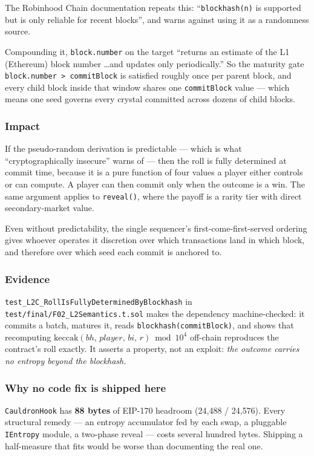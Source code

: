 \documentclass[11pt,a4paper]{article}
\newcommand{\code}[1]{\texttt{\small #1}}
\newcommand{\fileref}[1]{\texttt{\scriptsize #1}}
\begin{document}
\noindent The Robinhood Chain documentation repeats this: ``\code{blockhash(n)} is
supported but is only reliable for recent blocks'', and warns against using it as
a randomness source.

Compounding it, \code{block.number} on the target ``returns an estimate of the L1
(Ethereum) block number \dots and updates only periodically.'' So the maturity
gate \code{block.number > commitBlock} is satisfied roughly once per parent block,
and every child block inside that window shares one \code{commitBlock} value ---
which means one seed governs every crystal committed across dozens of child
blocks.

\subsubsection*{Impact}

If the pseudo-random derivation is predictable --- which is what
``cryptographically insecure'' warns of --- then the roll is fully determined at
commit time, because it is a pure function of four values a player either
controls or can compute. A player can then commit only when the outcome is a win.
The same argument applies to \code{reveal()}, where the payoff is a rarity tier
with direct secondary-market value.

Even without predictability, the single sequencer's first-come-first-served
ordering gives whoever operates it discretion over which transactions land in
which block, and therefore over which seed each commit is anchored to.

\subsubsection*{Evidence}

\code{test\_L2C\_RollIsFullyDeterminedByBlockhash} in
\fileref{test/final/F02\_L2Semantics.t.sol} makes the dependency machine-checked:
it commits a batch, matures it, reads \code{blockhash(commitBlock)}, and shows
that recomputing $\mathrm{keccak}(bh,\,player,\,bi,\,r) \bmod 10^4$ off-chain
reproduces the contract's roll exactly. It asserts a property, not an exploit:
\emph{the outcome carries no entropy beyond the blockhash.}

\subsubsection*{Why no code fix is shipped here}

\code{CauldronHook} has \textbf{88 bytes} of EIP-170 headroom
(24{,}488 / 24{,}576). Every structural remedy --- an entropy accumulator fed by
each swap, a pluggable \code{IEntropy} module, a two-phase reveal --- costs
several hundred bytes. Shipping a half-measure that fits would be worse than
documenting the real one.
\end{document}
